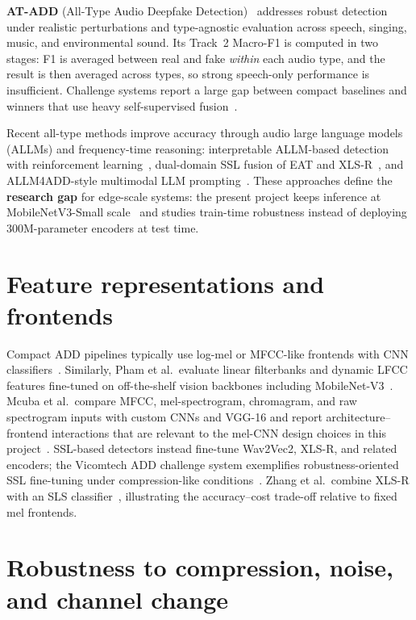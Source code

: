 \textbf{AT-ADD} (All-Type Audio Deepfake Detection)~\cite{xie2026atadd} addresses robust detection under realistic perturbations and type-agnostic evaluation across speech, singing, music, and environmental sound. Its Track~2 Macro-F1 is computed in two stages: F1 is averaged between real and fake \emph{within} each audio type, and the result is then averaged across types, so strong speech-only performance is insufficient. Challenge systems report a large gap between compact baselines and winners that use heavy self-supervised fusion~\cite{xie2026atadd,fan2026dualssl}.

Recent all-type methods improve accuracy through audio large language models (ALLMs) and frequency-time reasoning: interpretable ALLM-based detection with reinforcement learning~\cite{xie2026ftgrpo}, dual-domain SSL fusion of EAT and XLS-R~\cite{fan2026dualssl}, and ALLM4ADD-style multimodal LLM prompting~\cite{gu2024allm4add}. These approaches define the \textbf{research gap} for edge-scale systems: the present project keeps inference at MobileNetV3-Small scale~\cite{howard2019mobilenetv3} and studies train-time robustness instead of deploying 300M-parameter encoders at test time.

\section{Feature representations and frontends}

Compact ADD pipelines typically use log-mel or MFCC-like frontends with CNN classifiers~\cite{shaaban2023ieeeAccess,mcuba2023deeplearning}. Similarly, Pham et al.\ evaluate linear filterbanks and dynamic LFCC features fine-tuned on off-the-shelf vision backbones including MobileNet-V3~\cite{pham2024deepfake}. Mcuba et al.\ compare MFCC, mel-spectrogram, chromagram, and raw spectrogram inputs with custom CNNs and VGG-16 and report architecture--frontend interactions that are relevant to the mel-CNN design choices in this project~\cite{mcuba2023deeplearning}. SSL-based detectors instead fine-tune Wav2Vec2, XLS-R, and related encoders; the Vicomtech ADD challenge system exemplifies robustness-oriented SSL fine-tuning under compression-like conditions~\cite{martindonas2022vicomtech}. Zhang et al.\ combine XLS-R with an SLS classifier~\cite{zhang2023sls}, illustrating the accuracy--cost trade-off relative to fixed mel frontends.

\section{Robustness to compression, noise, and channel change}

